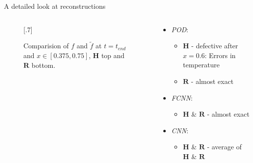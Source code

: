 \documentclass[usenames,dvipsnames,Nike,mathserif]{tuberlinbeamer}
\begin{document}
\begin{frame}[fragile]{A detailed look at reconstructions}
	\begin{columns}
		\begin{column}{.61\textwidth}
			\begin{figure}
				\vspace{-.5cm}
				\scalebox{.7}[.7]{}
				\caption{
					Comparision of $f$ and $\tilde{f}$ at $t=t_{end}$ and $x\in[0.375,0.75]$, $\mathbf{H}$ top and $\mathbf{R}$ bottom.}
			\end{figure}
		\end{column}
		\begin{column}{.39\textwidth}
			\begin{itemize}
				\item\emph{POD}:
				\begin{itemize}
					\item $\mathbf{H}$ - defective after $x=0.6$: Errors in temperature
					\item $\mathbf{R}$ - almost exact
				\end{itemize}
				\item\emph{FCNN}:
				\begin{itemize}
					\item $\mathbf{H}$ \& $\mathbf{R}$ - almost exact 
				\end{itemize}
				\item\emph{CNN}:
				\begin{itemize}
					\item $\mathbf{H}$ \& $\mathbf{R}$ - average of $\mathbf{H}$ \& $\mathbf{R}$
				\end{itemize}
			\end{itemize}
		\end{column}
	\end{columns}
\end{frame}
\end{document}
